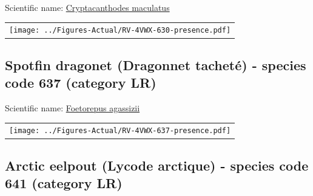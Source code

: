 \documentclass[12pt]{article}\usepackage[]{graphicx}\usepackage[]{color}
\begin{document}

Scientific name: \href{http://www.marinespecies.org/aphia.php?p=taxdetails\&id=159675}{Cryptacanthodes maculatus} \newline
\begin{minipage}{1.0\textwidth}
 \begin{tabular}{c}
\texttt{[image: ../Figures-Actual/RV-4VWX-630-presence.pdf]} \\ 
\end{tabular} 
\end{minipage}
\clearpage

\renewcommand\thefigure{\thesubsection\Alph{figure}}

\setcounter{figure}{0}

\hypertarget{sec:637}{%
\subsection{Spotfin dragonet (Dragonnet tacheté) - species code 637 (category LR)}\label{sec:637}}

  


Scientific name: \href{http://www.marinespecies.org/aphia.php?p=taxdetails\&id=276339}{Foetorepus agassizii} \newline
\begin{minipage}{1.0\textwidth}
 \begin{tabular}{c}
\texttt{[image: ../Figures-Actual/RV-4VWX-637-presence.pdf]} \\ 
\end{tabular} 
\end{minipage}
\clearpage

\renewcommand\thefigure{\thesubsection\Alph{figure}}

\setcounter{figure}{0}

\hypertarget{sec:641}{%
\subsection{Arctic eelpout (Lycode arctique) - species code 641 (category LR)}\label{sec:641}}

  
\end{document}
